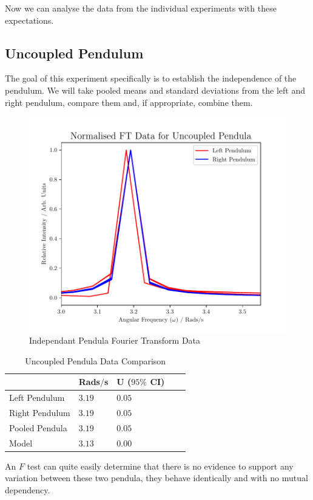 \documentclass[aps,prl,reprint,10pt,amsmath,amssymb,superscriptaddress,a4paper, floatfix]{revtex4-2}
\begin{document}
Now we can analyse the data from the individual experiments with these expectations.

\subsection*{Uncoupled Pendulum}

The goal of this experiment specifically is to establish the independence of the pendulum. We will take pooled means and standard deviations from the left and right pendulum, compare them and, if appropriate, combine them.

\begin{figure}[H]
    \includegraphics[width = 8 cm]{Normalised Independant FT.pdf}
    \caption{Independant Pendula Fourier Transform Data}
    \label{fig:independent}
\end{figure}

\begin{table}[h]
    \begin{tabular}{@{}lllll@{}}
    \toprule
                      & Rads$/$s    & U ($95 \%$ CI)  & \\ \midrule
    Left Pendulum     & $3.19$      & $0.05$          & \\ 
    Right Pendulum    & $3.19$      & $0.05$          & \\ 
    Pooled Pendula    & $3.19$      & $0.05$          & \\
    Model             & $3.13$      & $0.00$          & \\ \bottomrule
    \end{tabular}
    \caption{Uncoupled Pendula Data Comparison}
\end{table}

An $F$ test can quite easily determine that there is no evidence to support any variation between these two pendula, they behave identically and with no mutual dependency.
\end{document}
